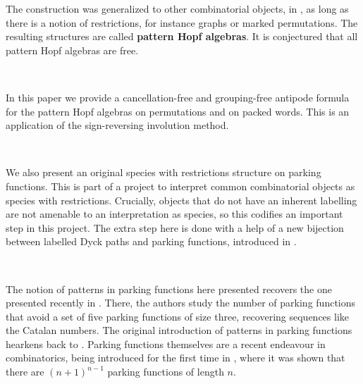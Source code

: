 \documentclass[12pt, reqno]{amsart}
\theoremstyle{definition}
\begin{document}
The construction was generalized to other combinatorial objects, in \cite{Penaguiao2020}, as long as there is a notion of restrictions, for instance graphs or marked permutations.
The resulting structures are called \textbf{pattern Hopf algebras}.
It is conjectured that all pattern Hopf algebras are free.

\

In this paper we provide a cancellation-free and grouping-free antipode formula for the pattern Hopf algebras on permutations and on packed words.
This is an application of the sign-reversing involution method.

\

We also present an original species with restrictions structure on parking functions.
This is part of a project to interpret common combinatorial objects as species with restrictions.
Crucially, objects that do not have an inherent labelling are not amenable to an interpretation as species, so this codifies an important step in this project.
The extra step here is done with a help of a new bijection between labelled Dyck paths and parking functions, introduced in \cite{BGLPV2021}.

\

The notion of patterns in parking functions here presented recovers the one presented recently in \cite{adeniran2022pattern}.
There, the authors study the number of parking functions that avoid a set of five parking functions of size three, recovering sequences like the Catalan numbers.
The original introduction of patterns in parking functions hearkens back to \cite{qiu2018patterns}.
Parking functions themselves are a recent endeavour in combinatorics, being introduced for the first time in \cite{konheim1966occupancy}, where it was shown that there are $(n+1)^{n-1}$ parking functions of length $n$.

\
\end{document}
